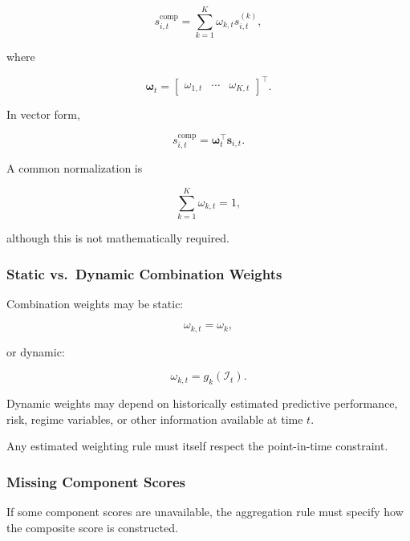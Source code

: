 \documentclass[11pt,a4paper]{article}
\begin{document}
\begin{equation}
\boxed{
s_{i,t}^{\mathrm{comp}}
=
\sum_{k=1}^{K}
\omega_{k,t}
s_{i,t}^{(k)},
}
\end{equation}

where

\begin{equation}
\boldsymbol{\omega}_t
=
\begin{bmatrix}
\omega_{1,t}
&
\cdots
&
\omega_{K,t}
\end{bmatrix}^{\top}.
\end{equation}

In vector form,

\begin{equation}
\boxed{
s_{i,t}^{\mathrm{comp}}
=
\boldsymbol{\omega}_t^{\top}
\mathbf{s}_{i,t}.
}
\end{equation}

A common normalization is

\begin{equation}
\sum_{k=1}^{K}
\omega_{k,t}
=
1,
\end{equation}

although this is not mathematically required.


\subsubsection{Static vs.\ Dynamic Combination Weights}

Combination weights may be static:

\begin{equation}
\omega_{k,t}
=
\omega_k,
\end{equation}

or dynamic:

\begin{equation}
\omega_{k,t}
=
g_k
\left(
\mathcal{I}_t
\right).
\end{equation}

Dynamic weights may depend on historically estimated predictive performance,
risk, regime variables, or other information available at time $t$.

Any estimated weighting rule must itself respect the point-in-time constraint.


\subsubsection{Missing Component Scores}

If some component scores are unavailable, the aggregation rule must specify
how the composite score is constructed.
\end{document}
